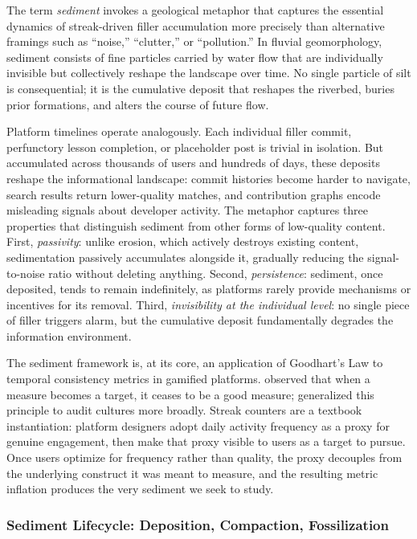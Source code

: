 \documentclass[12pt]{article}
\begin{document}
The term \emph{sediment} invokes a geological metaphor that captures the essential dynamics of streak-driven filler accumulation more precisely than alternative framings such as ``noise,'' ``clutter,'' or ``pollution.'' In fluvial geomorphology, sediment consists of fine particles carried by water flow that are individually invisible but collectively reshape the landscape over time. No single particle of silt is consequential; it is the cumulative deposit that reshapes the riverbed, buries prior formations, and alters the course of future flow.

Platform timelines operate analogously. Each individual filler commit, perfunctory lesson completion, or placeholder post is trivial in isolation. But accumulated across thousands of users and hundreds of days, these deposits reshape the informational landscape: commit histories become harder to navigate, search results return lower-quality matches, and contribution graphs encode misleading signals about developer activity. The metaphor captures three properties that distinguish sediment from other forms of low-quality content. First, \emph{passivity}: unlike erosion, which actively destroys existing content, sedimentation passively accumulates alongside it, gradually reducing the signal-to-noise ratio without deleting anything. Second, \emph{persistence}: sediment, once deposited, tends to remain indefinitely, as platforms rarely provide mechanisms or incentives for its removal. Third, \emph{invisibility at the individual level}: no single piece of filler triggers alarm, but the cumulative deposit fundamentally degrades the information environment.

The sediment framework is, at its core, an application of Goodhart's Law to temporal consistency metrics in gamified platforms. \citet{Goodhart1975} observed that when a measure becomes a target, it ceases to be a good measure; \citet{Strathern1997} generalized this principle to audit cultures more broadly. Streak counters are a textbook instantiation: platform designers adopt daily activity frequency as a proxy for genuine engagement, then make that proxy visible to users as a target to pursue. Once users optimize for frequency rather than quality, the proxy decouples from the underlying construct it was meant to measure, and the resulting metric inflation produces the very sediment we seek to study.

\subsubsection{Sediment Lifecycle: Deposition, Compaction, Fossilization}
\label{sec:lifecycle}
\end{document}
